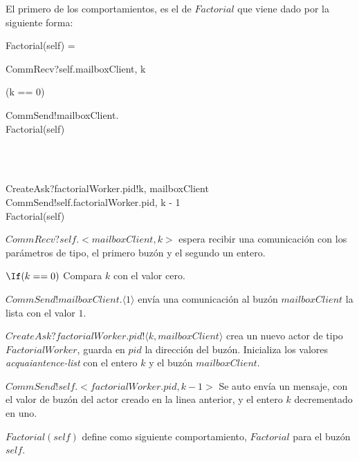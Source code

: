 El primero de los comportamientos, es el de $Factorial$ que viene dado por la siguiente forma:
\begin{process}
Factorial(self) = {} \\ \quad
  \begin{block}
  CommRecv?self.\langle mailboxClient, k \rangle \then {} \\ \quad
    \begin{block}
    \If (k == 0) \Then {} \\ \quad
      \begin{block} 
      CommSend!mailboxClient. \rangle \then \\
      Factorial(self) 
      \end{block} \\
    \Else {} \\ \quad
      \begin{block}
      CreateAsk?factorialWorker.pid!\langle k, mailboxClient \rangle \then \\
      CommSend!self.\langle factorialWorker.pid, k - 1 \rangle \then \\
      Factorial(self)
      \end{block}
    \end{block}
  \end{block}
\end{process}


\begin{description}
 \item $CommRecv?self.<mailboxClient, k>$ espera recibir una comunicación con los parámetros de tipo, el primero buzón y el segundo un entero.
 \item $\If (k == 0)$ Compara $k$ con el valor cero.
 \item $CommSend!mailboxClient.\langle 1 \rangle$ envía una comunicación al buzón $mailboxClient$ la lista con el valor $1$.
 \item $CreateAsk?factorialWorker.pid!\langle k, mailboxClient \rangle$ crea un nuevo actor de tipo $FactorialWorker$, guarda en $pid$ la dirección del buzón. Inicializa los valores \textit{acquaiantence-list} con el entero $k$ y el buzón $mailboxClient$.
 \item $CommSend!self.<factorialWorker.pid, k - 1 >$ Se auto envía un mensaje, con el valor de buzón del actor creado en la linea anterior, y el entero $k$ decrementado en uno.
 \item $Factorial(self)$ define como siguiente comportamiento, $Factorial$ para el buzón $self$.
\end{description}

